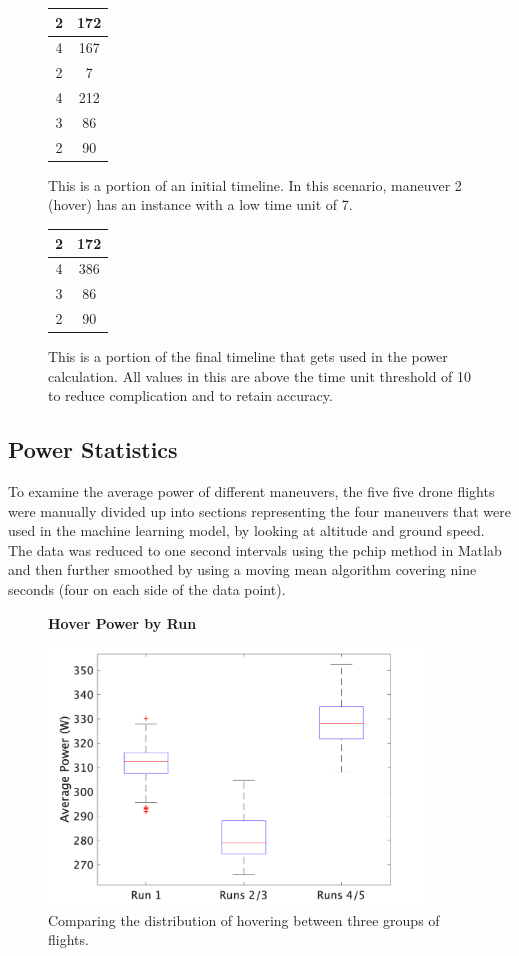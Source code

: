 \documentclass{article}
\begin{document}
\begin{figure}[!htb]
\centering
{}
	\centering
	\begin{tabular}{|c|c|}
	\hline
	2&172\\
	\hline
	4&167\\
	\hline
	2&7\\
	\hline
	4&212\\
	\hline
	3&86\\
	\hline
	2&90\\
	\hline
	\end{tabular}
	\caption{This is a portion of an initial timeline. In this scenario, maneuver 2 (hover) has an instance with a low time unit of 7.}
	\label{fig:original}
\endminipage\hfill
{}
	\centering
	\begin{tabular}{|c|c|}
	\hline
	2&172\\
	\hline
	4&386\\
	\hline
	3&86\\
	\hline
	2&90\\
	\hline
	\end{tabular}
	\caption{This is a portion of the final timeline that gets used in the power calculation. All values in this are above the time unit threshold of 10 to reduce complication and to retain accuracy.}
	\label{fig:fixed}
\endminipage\hfill
\end{figure}


\subsection{Power Statistics}
To examine the average power of different maneuvers, the five five drone flights were manually divided up into sections representing the four maneuvers that were used in the machine learning model, by looking at altitude and ground speed. The data was reduced to one second intervals using the pchip method in Matlab and then further smoothed by using a moving mean algorithm covering nine seconds (four on each side of the data point).\par

\begin{figure}
  \centering
  \large{\textbf{Hover Power by Run}}\par
  \includegraphics[width = 100mm]{images/HoverPlain.png}
  \caption{Comparing the distribution of hovering between three groups of flights.}
  \label{fig:hover}
\end{figure}
\end{document}
